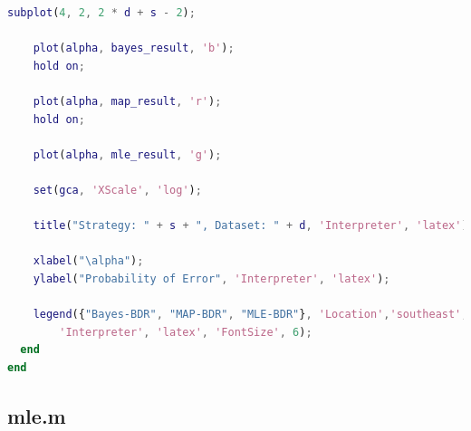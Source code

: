 \documentclass{article}
\begin{document}
\begin{lstlisting}[language=Matlab]
    subplot(4, 2, 2 * d + s - 2);
    
    plot(alpha, bayes_result, 'b');
    hold on;
    
    plot(alpha, map_result, 'r');
    hold on;
    
    plot(alpha, mle_result, 'g');
    
    set(gca, 'XScale', 'log');
    
    title("Strategy: " + s + ", Dataset: " + d, 'Interpreter', 'latex');
    
    xlabel("\alpha");
    ylabel("Probability of Error", 'Interpreter', 'latex');
    
    legend({"Bayes-BDR", "MAP-BDR", "MLE-BDR"}, 'Location','southeast', ...
        'Interpreter', 'latex', 'FontSize', 6);
  end
end
\end{lstlisting}

\pagebreak

\subsection*{mle.m}
\end{document}
